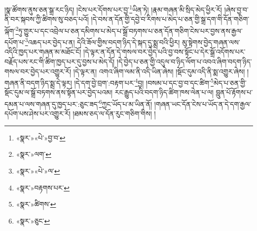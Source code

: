།སྣ་ཚོགས་ནུས་ཅན་སྒྲ་རང་ཉིད། །ངེས་པར་དོགས་པར་བྱ་\footnote{«སྣར་»«པེ་»བྱ་བ་}ཡིན་ཏེ། །རྣམ་གཞན་མི་སྲིད་མེད་ཕྱིར་རོ། །ཞེས་བྱ་བ་ནི་བར་སྐབས་ཀྱི་ཚིགས་སུ་བཅད་པའོ། །དེ་བས་ན་དོན་གྱི་དབྱེ་བ་རིགས་པ་མེད་པ་ཅན་གྱི་སྒྲ་དག་གི་དོན་གཅིག་ལྐོག་\footnote{«སྣར་»ལག་}ཏུ་གྱུར་པ་དང་འབྲེལ་པ་ཅན་དམིགས་པ་མེད་པ་སྒྲོ་བཏགས་པ་ཅན་དོན་གཅིག་ངེས་པར་བྱས་ནས་རྒྱལ་དཔོག་པ་\footnote{«སྣར་»«པེ་»ལ་}འཆད་པར་བྱེད་པ་ན། དེའི་ཟོལ་གྱིས་བདག་ཉིད་དེ་སྐད་དུ་སྨྲ་བའི་ཕྱིར། མུ་སྟེགས་བྱེད་གཞན་ལས་འདིའི་ཁྱད་པར་གཞན་མ་མཐོང་ངོ། །དེ་ལྟར་ན་དོན་དེ་གསལ་བར་བྱེད་པའི་བྱ་བས་སྟོང་པ་དེར་སྒྲོ་འདོགས་པར་བརྗོད་པས་རང་གི་ཚིག་ཁྱད་པར་དུ་བྱས་པ་མེད་དོ། །དེ་བྱེད་པ་ཅན་གྱི་འདུལ་བ་ཉིད་ལོག་པ་འབའ་ཞིག་བདག་ཉིད་གསལ་བར་བྱེད་པར་འགྱུར་རོ། །དེ་ལྟར་ན། འགའ་ཞིག་ལམ་ནི་འདི་ཡིན་ཞེས། །སྡོང་དུམ་འདི་ནི་སྨ་འགྱུར་ཞེས། །གཞན་ནི་བདག་ཉིད་སྨྲ་དེ་ལྟར། །དེ་དག་བྱེ་བྲག་:བརྟག་པར་\footnote{«སྣར་»བརྟགས་པར་}བྱ། །བསམ་པ་དང་བྱ་བ་དང་ཚིག་\footnote{«སྣར་»ཚིགས་}མེད་པ་ཅན་གྱི་སྡོང་དུམ་ལ་སྒྲོ་བཏགས་ནས་སྟོན་པར་བྱེད་པའམ། རང་རྒྱུད་པའི་བདག་ཉིད་ཚིག་ཁས་ལེན་པ་ལ། བླུན་པོ་རྟོགས་པ་དམན་པ་ལས་གཞན་དུ་ཁྱད་པར་:ཅུང་ཟད་\footnote{«སྣར་»ཅུང་}ཀྱང་ཡོད་པ་མ་ཡིན་ནོ། །གཞན་ཡང་དོན་ངེས་པ་ཡོད་ན་དེ་དག་རྒྱལ་དཔོག་པས་ཤེས་པར་འགྱུར་རོ། །ཐམས་ཅད་ལ་དོན་རུང་གཅིག་གིས། །

